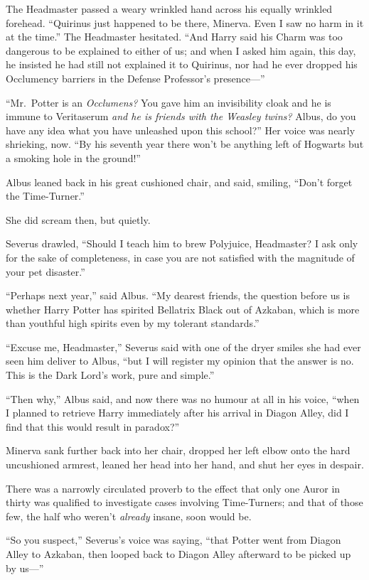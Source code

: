 The Headmaster passed a weary wrinkled hand across his equally wrinkled
forehead. ``Quirinus just happened to be there, Minerva. Even I saw no
harm in it at the time.'' The Headmaster hesitated. ``And Harry said his
Charm was too dangerous to be explained to either of us; and when I
asked him again, this day, he insisted he had still not explained it to
Quirinus, nor had he ever dropped his Occlumency barriers in the Defense
Professor's presence---''

``Mr.~Potter is an \emph{Occlumens?} You gave him an invisibility cloak
and he is immune to Veritaserum \emph{and he is friends with the Weasley
twins?} Albus, do you have any idea what you have unleashed upon this
school?'' Her voice was nearly shrieking, now. ``By his seventh year
there won't be anything left of Hogwarts but a smoking hole in the
ground!''

Albus leaned back in his great cushioned chair, and said, smiling,
``Don't forget the Time-Turner.''

She did scream then, but quietly.

Severus drawled, ``Should I teach him to brew Polyjuice, Headmaster? I
ask only for the sake of completeness, in case you are not satisfied
with the magnitude of your pet disaster.''

``Perhaps next year,'' said Albus. ``My dearest friends, the question
before us is whether Harry Potter has spirited Bellatrix Black out of
Azkaban, which is more than youthful high spirits even by my tolerant
standards.''

``Excuse me, Headmaster,'' Severus said with one of the dryer smiles she
had ever seen him deliver to Albus, ``but I will register my opinion
that the answer is no. This is the Dark Lord's work, pure and simple.''

``Then why,'' Albus said, and now there was no humour at all in his
voice, ``when I planned to retrieve Harry immediately after his arrival
in Diagon Alley, did I find that this would result in paradox?''

Minerva sank further back into her chair, dropped her left elbow onto
the hard uncushioned armrest, leaned her head into her hand, and shut
her eyes in despair.

There was a narrowly circulated proverb to the effect that only one
Auror in thirty was qualified to investigate cases involving
Time-Turners; and that of those few, the half who weren't \emph{already}
insane, soon would be.

``So you suspect,'' Severus's voice was saying, ``that Potter went from
Diagon Alley to Azkaban, then looped back to Diagon Alley afterward to
be picked up by us---''

